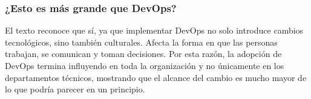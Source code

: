 \documentclass[12pt, a4paper]{article}
\begin{document}
\subsubsection*{\textbf{¿Esto es más grande que DevOps?}}
El texto reconoce que sí, ya que implementar DevOps no solo introduce cambios tecnológicos, sino también culturales. Afecta
la forma en que las personas trabajan, se comunican y toman decisiones. Por esta razón, la adopción de DevOps termina
influyendo en toda la organización y no únicamente en los departamentos técnicos, mostrando que el alcance del cambio es
mucho mayor de lo que podría parecer en un principio.
\end{document}
